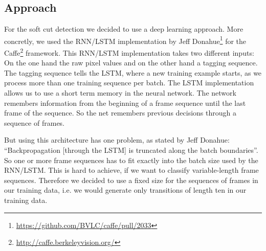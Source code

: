 \subsection{Approach}
\label{sec:soft_cut_approach}

For the soft cut detection we decided to use a deep learning approach.
More concretly, we used the RNN/LSTM implementation by Jeff Donahue\footnote{\url{https://github.com/BVLC/caffe/pull/2033}} for the Caffe\footnote{\url{http://caffe.berkeleyvision.org/}} framework.
This RNN/LSTM implementation takes two different inputs: On the one hand the raw pixel values and on the other hand a tagging sequence.
The tagging sequence tells the LSTM, where a new training example starts, as we process more than one training sequence per batch.
The LSTM implementation allows us to use a short term memory in the neural network.
The network remembers information from the beginning of a frame sequence until the last frame of the sequence.
So the net remembers previous decisions through a sequence of frames.

But using this architecture has one problem, as stated by Jeff Donahue: ``Backpropagation [through the LSTM] is truncated along the batch boundaries''. %
So one or more frame sequences has to fit exactly into the batch size used by the RNN/LSTM.
This is hard to achieve, if we want to classify variable-length frame sequences.
Therefore we decided to use a fixed size for the sequences of frames in our training data, i.e. we would generate only transitions of length ten in our training data.

